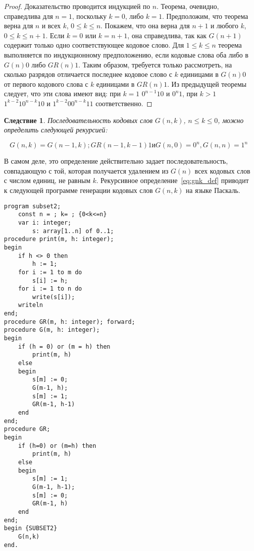 \documentclass[12pt,a4paper]{article}
\theoremstyle{plain}
\newtheorem*{seq}{Следствие}
\theoremstyle{definition}
\theoremstyle{remark}
\begin{document}
\begin{proof}
Доказательство проводится индукцией по $n$. Теорема, очевидно, справедлива для $n=1$, поскольку $k=0$, либо $k=1$. Предположим, что теорема верна для $n$ и всех $k$, $0\le k\le n$. Покажем, что она верна для $n+1$ и любого $k$, $0\le k\le n+1$. Если $k=0$ или $k=n+1$, она справедлива, так как $G(n+1)$ содержит только одно соответствующее кодовое слово. Для $1\le k\le n$ теорема выполняется по индукционному предположению, если кодовые слова оба либо в $G(n)0$ либо $GR(n)1$. Таким образом, требуется только рассмотреть, на сколько разрядов отличается последнее кодовое слово с $k$ единицами в $G(n)0$ от первого кодового слова с $k$ единицами в $GR(n)1$. Из предыдущей теоремы следует, что эти слова имеют вид: при $k=1$ $0^{n-1}10$ и $0^n1$, при $k>1$ $1^{k-2}10^{n-k}10$ и $1^{k-2}00^{n-k}11$ соответственно.
\end{proof}

\begin{seq}
Последовательность кодовых слов $G(n,k)$, $n\le k\le 0$, можно определить следующей рекурсией:

\begin{equation}
\label{eq:gnk_def}
G(n,k)=G(n-1,k); GR(n-1,k-1)1 \text{и} G(n,0)=0^n, G(n,n)=1^n
\end{equation}
\end{seq}

В самом деле, это определение действительно задает последовательность, совпадающую с той, которая получается удалением из $G(n)$ всех кодовых слов с числом единиц, не равным $k$. Рекурсивное определение~\eqref{eq:gnk_def} приводит к следующей программе генерации кодовых слов $G(n,k)$ на языке Паскаль.

\begin{verbatim}
program subset2;
    const n = ; k= ; {0<k<=n}
    var i: integer;
        s: array[1..n] of 0..1;
procedure print(m, h: integer);
begin
    if h <> 0 then
        h := 1;
    for i := 1 to m do
        s[i] := h;
    for i := 1 to n do
        write(s[i]);
    writeln
end;
procedure GR(m, h: integer); forward;
procedure G(m, h: integer);
begin
    if (h = 0) or (m = h) then
        print(m, h)
    else
    begin
        s[m] := 0; 
        G(m-1, h);
        s[m] := 1; 
        GR(m-1, h-1)
    end
end;
procedure GR;
begin
    if (h=0) or (m=h) then
        print(m, h)
    else
    begin
        s[m] := 1;
        G(m-1, h-1);
        s[m] := 0;
        GR(m-1, h)
    end
end;
begin {SUBSET2}
    G(n,k)
end.
\end{verbatim}
\end{document}
